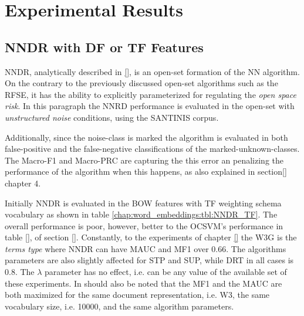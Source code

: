 \section{Experimental Results}\label{chap:word_embeddings:sec:results}

\subsection{NNDR with DF or TF Features}\label{chap:word_embeddings:sec:NNDR_PVBOW_vs_BOW}

NNDR, analytically described in \ref{}, is an open-set formation of the NN algorithm. On the contrary to the previously discussed open-set algorithms such as the RFSE, it has the ability to explicitly parameterized for regulating the \textit{open space risk}. In this paragraph the NNRD performance is evaluated in the open-set with \textit{unstructured noise} conditions, using the SANTINIS corpus.

Additionally, since the noise-class is marked the algorithm is evaluated in both false-positive and the false-negative classifications of the marked-unknown-classes. The Macro-F1 and Macro-PRC are capturing the this error an penalizing the performance of the algorithm when this happens, as also explained in section\ref{} chapter 4.

Initially NNDR is evaluated in the BOW features with TF weighting schema vocabulary as shown in table \ref{chap:word_embeddings:tbl:NNDR_TF}. The overall performance is poor, however, better to the OCSVM's performance in table \ref{}, of section \ref{}. Constantly, to the experiments of chapter \ref{} the W3G is the \textit{terms type} where NNDR can have MAUC and MF1 over $0.66$. The algorithms parameters are also slightly affected for STP and SUP, while DRT in all cases is $0.8$. The $\lambda$ parameter has no effect, i.e. can be any value of the available set of these experiments. In should also be noted that the MF1 and the MAUC are both maximized for the same document representation, i.e. W3, the same vocabulary size, i.e. 10000, and the same algorithm parameters.

